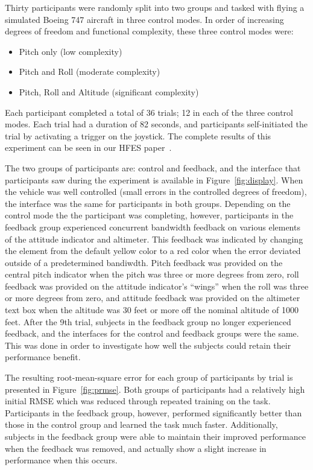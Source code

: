 Thirty participants were randomly split into two groups and tasked with flying a simulated Boeing 747 aircraft in three control modes. In order of increasing degrees of freedom and functional complexity, these three control modes were:
\begin{itemize}
\item Pitch only (low complexity)
\item Pitch and Roll (moderate complexity)
\item Pitch, Roll and Altitude (significant complexity)
\end{itemize}
Each participant completed a total of 36 trials; 12 in each of the three control modes.
Each trial had a duration of 82 seconds, and participants self-initiated the trial by activating a trigger on the joystick.
The complete results of this experiment can be seen in our HFES paper~\cite{RN42}.

The two groups of participants are: control and feedback, and the interface that participants saw during the experiment is available in Figure~\ref{fig:display}.
When the vehicle was well controlled (small errors in the controlled degrees of freedom), the interface was the same for participants in both groups.
Depending on the control mode the the participant was completing, however, participants in the feedback group experienced concurrent bandwidth feedback on various elements of the attitude indicator and altimeter.
This feedback was indicated by changing the element from the default yellow color to a red color when the error deviated outside of a predetermined bandiwdth.
Pitch feedback was provided on the central pitch indicator when the pitch was three or more degrees from zero, roll feedback was provided on the attitude indicator's ``wings'' when the roll was three or more degrees from zero, and attitude feedback was provided on the altimeter text box when the altitude was 30 feet or more off the nominal altitude of 1000 feet.
After the 9th trial, subjects in the feedback group no longer experienced feedback, and the interfaces for the control and feedback groups were the same.
This was done in order to investigate how well the subjects could retain their performance benefit.

The resulting root-mean-square error for each group of participants by trial is presented in Figure~\ref{fig:prmse}.
Both groups of participants had a relatively high initial RMSE which was reduced through repeated training on the task.
Participants in the feedback group, however, performed significantly better than those in the control group and learned the task much faster.
Additionally, subjects in the feedback group were able to maintain their improved performance when the feedback was removed, and actually show a slight increase in performance when this occurs.


